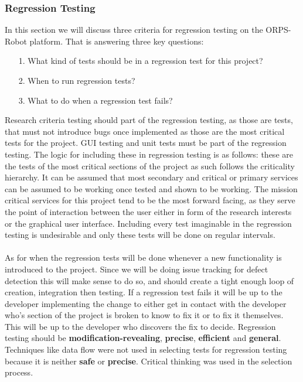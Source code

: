 \documentclass[english,12pt]{article}
\begin{document}
\subsubsection{Regression Testing}
In this section we will discuss three criteria for regression testing on the ORPS-Robot platform. 
That is answering three key questions:\\
\begin{itemize}
    \item[1.] What kind of tests should be in a regression test for this project?
    \item[2.] When to run regression tests?
    \item[3.] What to do when a regression test fails? 
\end{itemize}
Research criteria testing should part of the regression testing, as those are tests, that must not introduce 
bugs once implemented as those are the most critical tests for the project. GUI testing and unit tests 
must be part of the regression testing. The logic for including these in regression testing is as follows: 
these are the tests of the most critical sections of the project as such follows the criticality hierarchy. 
It can be assumed that most secondary and critical or primary services can be assumed to be working once tested 
and shown to be working. The mission critical services for this project tend to be the most forward facing, as they 
serve the point of interaction between the user either in form of the research interests or the graphical user interface. 
Including every test imaginable in the regression testing is undesirable and only these tests will be done on regular intervals.\\\\
As for when the regression tests will be done whenever a new functionality is introduced to the 
project. Since we will be doing issue tracking for defect detection this will make sense to do so, and should create a tight enough 
loop of creation, integration then testing. If a regression test fails it will be up to the developer implementing the change to either 
get in contact with the developer who's section of the project is broken to know to fix it or to fix it themselves. This will be up to the 
developer who discovers the fix to decide. Regression testing should be \textbf{modification-revealing}, \textbf{precise}, 
\textbf{efficient} and \textbf{general}. Techniques like data flow were not used in selecting tests for regression testing 
because it is neither \textbf{safe} or \textbf{precise}. Critical thinking was used in the selection process. 
\end{document}

